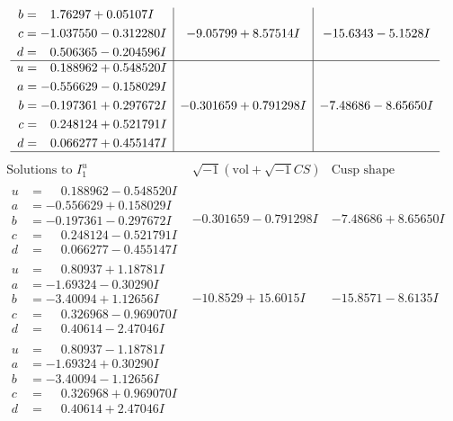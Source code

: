 \documentclass[1p]{elsarticle_modified}
\theoremstyle{definition}
\newcommand{\I}{\sqrt{-1}}
\begin{document}
$$\begin{array}{c|c|c}
\begin{aligned}
b &= \phantom{-}1.76297 + 0.05107 I \\
c &= -1.037550 - 0.312280 I \\
d &= \phantom{-}0.506365 - 0.204596 I\end{aligned}
 & -9.05799 + 8.57514 I & -15.6343 - 5.1528 I \\ \hline\begin{aligned}
u &= \phantom{-}0.188962 + 0.548520 I \\
a &= -0.556629 - 0.158029 I \\
b &= -0.197361 + 0.297672 I \\
c &= \phantom{-}0.248124 + 0.521791 I \\
d &= \phantom{-}0.066277 + 0.455147 I\end{aligned}
 & -0.301659 + 0.791298 I & -7.48686 - 8.65650 I\\
 \hline 
 \end{array}$$\newpage$$\begin{array}{c|c|c}  
\text{Solutions to }I^u_{1}& \I (\text{vol} + \sqrt{-1}CS) & \text{Cusp shape}\\
 \hline 
\begin{aligned}
u &= \phantom{-}0.188962 - 0.548520 I \\
a &= -0.556629 + 0.158029 I \\
b &= -0.197361 - 0.297672 I \\
c &= \phantom{-}0.248124 - 0.521791 I \\
d &= \phantom{-}0.066277 - 0.455147 I\end{aligned}
 & -0.301659 - 0.791298 I & -7.48686 + 8.65650 I \\ \hline\begin{aligned}
u &= \phantom{-}0.80937 + 1.18781 I \\
a &= -1.69324 - 0.30290 I \\
b &= -3.40094 + 1.12656 I \\
c &= \phantom{-}0.326968 - 0.969070 I \\
d &= \phantom{-}0.40614 - 2.47046 I\end{aligned}
 & -10.8529 + 15.6015 I & -15.8571 - 8.6135 I \\ \hline\begin{aligned}
u &= \phantom{-}0.80937 - 1.18781 I \\
a &= -1.69324 + 0.30290 I \\
b &= -3.40094 - 1.12656 I \\
c &= \phantom{-}0.326968 + 0.969070 I \\
d &= \phantom{-}0.40614 + 2.47046 I\end{aligned}

\end{array}$$
\end{document}
